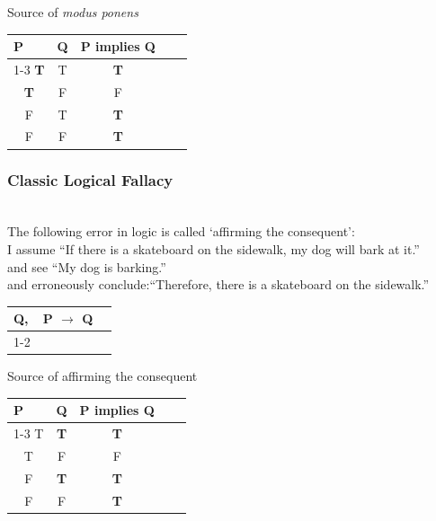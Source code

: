 \documentclass[aspectratio=169, handout]{beamer}
\numberwithin{equation}{section}
\begin{document}
\begin{frame}{Source of \emph{modus ponens}}

\begin{table}[]
\begin{tabular}{cccll}
\multicolumn{1}{l}{P} & \multicolumn{1}{l}{Q} & \multicolumn{1}{l}{P implies Q} &  &  \\ \cline{1-3}
\textbf{T}                     & T                     & \textbf{T}                              &  &  \\
\textbf{T}                     & F                     & F                               &  &  \\
F                     & T                     & \textbf{T}                                &  &  \\
F                     & F                     & \textbf{T}                               &  & 
\end{tabular}
\end{table} 
\end{frame}

\begin{frame}
\frametitle{Classic Logical Fallacy}

\ \\The following error in logic is called `affirming the consequent':\pause
\ \\I assume ``If there is a skateboard on the sidewalk, my dog will bark at it.''
\ \\and see ``My dog is barking.''\pause
\ \\and erroneously conclude:``Therefore, there is a skateboard on the sidewalk.''\pause

\begin{table}[]
\begin{tabular}{ccl}
\multicolumn{1}{l}{Q,} & \multicolumn{1}{l}{P $\rightarrow$ Q} &  \\ \cline{1-2}
\multicolumn{2}{c}{$P\ \lor \sim P$}                                    &  \\
\end{tabular}
\end{table} 
\end{frame}

\begin{frame}{Source of affirming the consequent}

\begin{table}[]
\begin{tabular}{cccll}
\multicolumn{1}{l}{P} & \multicolumn{1}{l}{Q} & \multicolumn{1}{l}{P implies Q} &  &  \\ \cline{1-3}
T                  & \textbf{T}                      & \textbf{T}                              &  &  \\
T                   & F                     & F                               &  &  \\
F                     & \textbf{T}                      & \textbf{T}                                &  &  \\
F                     & F                     & \textbf{T}                               &  & 
\end{tabular}
\end{table} 
\end{frame}
\end{document}
